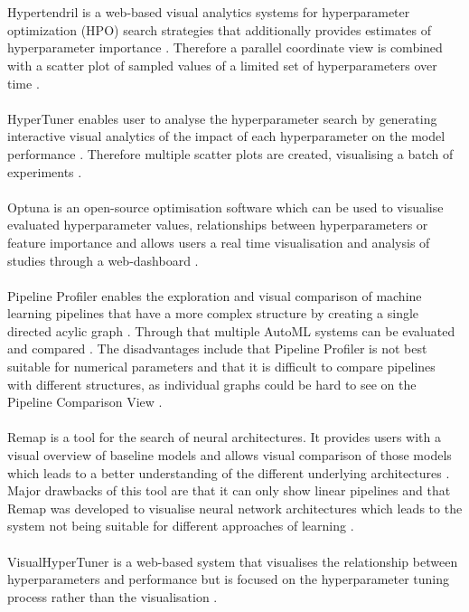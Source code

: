 \\ \\
Hypertendril \cite{hypertendril} is a web-based visual analytics systems for hyperparameter optimization (HPO) search strategies that additionally provides estimates of hyperparameter importance \cite{hypertendril, xautoml}. Therefore a parallel coordinate view is combined with a scatter plot of sampled values of a limited set of hyperparameters over time \cite{xautoml}.
\\ \\
HyperTuner \cite{hypertuner} enables user to analyse the hyperparameter search by generating interactive visual analytics of the impact of each hyperparameter on the model performance \cite{hypertuner, hypertendril}. Therefore multiple scatter plots are created, visualising a batch of experiments \cite{hypertendril}.
\\ \\
Optuna \cite{optuna} is an open-source optimisation software which can be used to visualise evaluated hyperparameter values, relationships between hyperparameters or feature importance and allows users a real time visualisation and analysis of studies through a web-dashboard \cite{xautoml, optuna}. 
\\ \\
Pipeline Profiler \cite{pipelineprof} enables the exploration and visual comparison of machine learning pipelines that have a more complex structure by creating a single directed acylic graph \cite{xautoml, pipelineprof}. Through that multiple AutoML systems can be evaluated and compared \cite{pipelineprof}. The disadvantages include that Pipeline Profiler is not best suitable for numerical parameters and that it is difficult to compare pipelines with different structures, as individual graphs could be hard to see on the Pipeline Comparison View \cite{pipelineprof}.
\\ \\
Remap \cite{remap} is a tool for the search of neural architectures. It provides users with a visual overview of baseline models and allows visual comparison of those models which leads to a better understanding of the different underlying architectures \cite{remap}. Major drawbacks of this tool are that it can only show linear pipelines and that Remap was developed to visualise neural network architectures which leads to the system not being suitable for different approaches of learning \cite{pipelineprof}.
\\ \\
VisualHyperTuner \cite{visualhypertuner} is a web-based system that visualises the relationship between hyperparameters and performance but is focused on the hyperparameter tuning process rather than the visualisation \cite{visualhypertuner, aiviz}.
